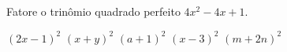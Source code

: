 Fatore o trinômio quadrado perfeito $4x^2-4x+1$.

$(2x-1)^2$
$(x+y)^2$
$(a+1)^2$
$(x-3)^2$
$(m+2n)^2$


